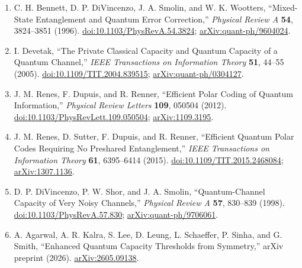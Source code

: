 \begin{enumerate}[label={},leftmargin=4.8em,labelsep=0.5em]
  \footnotesize
  \item[\textup{[BDSW96]}]\label{ref:p1-bennett}
  C. H. Bennett, D. P. DiVincenzo, J. A. Smolin, and W. K. Wootters,
  ``Mixed-State Entanglement and Quantum Error Correction,''
  \emph{Physical Review A} \textbf{54}, 3824--3851 (1996).
  \href{https://doi.org/10.1103/PhysRevA.54.3824}{doi:10.1103/PhysRevA.54.3824};
  \href{https://arxiv.org/abs/quant-ph/9604024}{arXiv:quant-ph/9604024}.

  \item[\textup{[Dev05]}]\label{ref:p1-devetak}
  I. Devetak, ``The Private Classical Capacity and Quantum Capacity of a
  Quantum Channel,'' \emph{IEEE Transactions on Information Theory}
  \textbf{51}, 44--55 (2005).
  \href{https://doi.org/10.1109/TIT.2004.839515}{doi:10.1109/TIT.2004.839515};
  \href{https://arxiv.org/abs/quant-ph/0304127}{arXiv:quant-ph/0304127}.

  \item[\textup{[RDR12]}]\label{ref:p1-renes-2012}
  J. M. Renes, F. Dupuis, and R. Renner,
  ``Efficient Polar Coding of Quantum Information,''
  \emph{Physical Review Letters} \textbf{109}, 050504 (2012).
  \newline
  \href{https://doi.org/10.1103/PhysRevLett.109.050504}{doi:10.1103/PhysRevLett.109.050504};
  \href{https://arxiv.org/abs/1109.3195}{arXiv:1109.3195}.

  \item[\textup{[RSDR15]}]\label{ref:p1-renes-2015}
  J. M. Renes, D. Sutter, F. Dupuis, and R. Renner, ``Efficient Quantum Polar
  Codes Requiring No Preshared Entanglement,'' \emph{IEEE Transactions on
  Information Theory} \textbf{61}, 6395--6414 (2015).
  \href{https://doi.org/10.1109/TIT.2015.2468084}{doi:10.1109/TIT.2015.2468084};
  \href{https://arxiv.org/abs/1307.1136}{arXiv:1307.1136}.

  \item[\textup{[DSS98]}]\label{ref:p1-divincenzo}
  D. P. DiVincenzo, P. W. Shor, and J. A. Smolin, ``Quantum-Channel Capacity
  of Very Noisy Channels,'' \emph{Physical Review A} \textbf{57}, 830--839
  (1998). \href{https://doi.org/10.1103/PhysRevA.57.830}{doi:10.1103/PhysRevA.57.830};
  \href{https://arxiv.org/abs/quant-ph/9706061}{arXiv:quant-ph/9706061}.

  \item[\textup{[AKL+26]}]\label{ref:p1-agarwal-et-al}
  A. Agarwal, A. R. Kalra, S. Lee, D. Leung, L. Schaeffer, P. Sinha, and
  G. Smith, ``Enhanced Quantum Capacity Thresholds from Symmetry,'' arXiv
  preprint (2026).
  \href{https://arxiv.org/abs/2605.09138}{arXiv:2605.09138}.


\end{enumerate}
